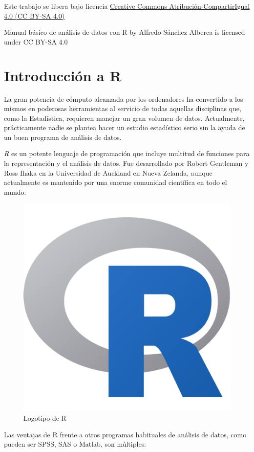 \documentclass[
]{book}
\begin{document}
Este trabajo se libera bajo licencia \href{https://creativecommons.org/licenses/by-sa/4.0/deed.es}{Creative Commons Atribución-CompartirIgual 4.0 (CC BY-SA 4.0)}

Manual básico de análisis de datos con R by Alfredo Sánchez Alberca is licensed under CC BY-SA 4.0

\hypertarget{introducciuxf3n-a-r}{%
\chapter{Introducción a R}\label{introducciuxf3n-a-r}}

La gran potencia de cómputo alcanzada por los ordenadores ha convertido a los mismos en poderosas herramientas al
servicio de todas aquellas disciplinas que, como la Estadística, requieren manejar un gran volumen de datos.
Actualmente, prácticamente nadie se plantea hacer un estudio estadístico serio sin la ayuda de un buen programa de
análisis de datos.

\emph{R} es un potente lenguaje de programación que incluye multitud de funciones para la representación y el análisis de
datos.
Fue desarrollado por Robert Gentleman y Ross Ihaka en la Universidad de Auckland en Nueva Zelanda, aunque actualmente es mantenido por una enorme comunidad científica en todo el mundo.

\begin{figure}

{\centering \includegraphics[width=0.25\linewidth]{img/Rlogo} 

}

\caption{Logotipo de R}\label{fig:rlogo}
\end{figure}

Las ventajas de R frente a otros programas habituales de análisis de datos, como pueden ser SPSS, SAS o Matlab, son múltiples:
\end{document}
